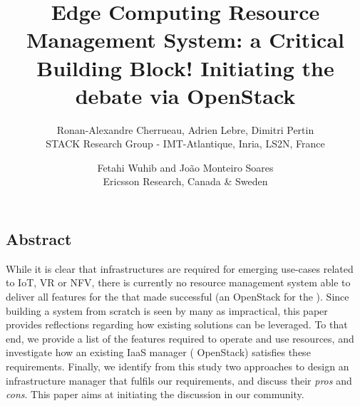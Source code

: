 \documentclass[letterpaper,twocolumn,10pt]{article}
\begin{document}
\date{}

\title{\Large \bf Edge Computing Resource Management System: a Critical
Building Block! Initiating the debate via OpenStack}

\author{
{\rm Ronan-Alexandre Cherrueau, Adrien Lebre, Dimitri Pertin}\\
STACK Research Group - IMT-Atlantique, Inria, LS2N, France
\and
{\rm Fetahi Wuhib and  João Monteiro Soares}\\
Ericsson Research, Canada \& Sweden\\
} %

\maketitle



\subsection*{Abstract}
While it is clear that \edge infrastructures are required for emerging
use-cases related to IoT, VR or NFV, there is currently no resource management
system able to deliver all features for the \edge that made \cloudcomputing successful
(\eg an OpenStack for the \edge).
%
Since building a system from scratch is seen by many as impractical,
this paper provides reflections regarding how existing solutions can be leveraged.
%
To that end, we provide a list of the features required to operate and use
\edgecomputing resources, and investigate how an existing IaaS manager (\ie
OpenStack) satisfies these requirements. Finally, we identify from this study two
approaches to design an \edge infrastructure manager that fulfils our
requirements, and discuss their \emph{pros} and \emph{cons}. This paper aims at
initiating the discussion in our community. 

\end{document}
